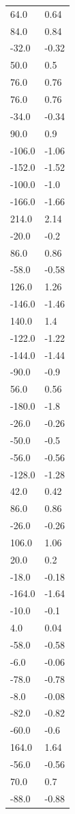 \begin{longtable}{ll}
64.0 & 0.64 \\
84.0 & 0.84 \\
-32.0 & -0.32 \\
50.0 & 0.5 \\
76.0 & 0.76 \\
76.0 & 0.76 \\
-34.0 & -0.34 \\
90.0 & 0.9 \\
-106.0 & -1.06 \\
-152.0 & -1.52 \\
-100.0 & -1.0 \\
-166.0 & -1.66 \\
214.0 & 2.14 \\
-20.0 & -0.2 \\
86.0 & 0.86 \\
-58.0 & -0.58 \\
126.0 & 1.26 \\
-146.0 & -1.46 \\
140.0 & 1.4 \\
-122.0 & -1.22 \\
-144.0 & -1.44 \\
-90.0 & -0.9 \\
56.0 & 0.56 \\
-180.0 & -1.8 \\
-26.0 & -0.26 \\
-50.0 & -0.5 \\
-56.0 & -0.56 \\
-128.0 & -1.28 \\
42.0 & 0.42 \\
86.0 & 0.86 \\
-26.0 & -0.26 \\
106.0 & 1.06 \\
20.0 & 0.2 \\
-18.0 & -0.18 \\
-164.0 & -1.64 \\
-10.0 & -0.1 \\
4.0 & 0.04 \\
-58.0 & -0.58 \\
-6.0 & -0.06 \\
-78.0 & -0.78 \\
-8.0 & -0.08 \\
-82.0 & -0.82 \\
-60.0 & -0.6 \\
164.0 & 1.64 \\
-56.0 & -0.56 \\
70.0 & 0.7 \\
-88.0 & -0.88 \\

\end{longtable}
